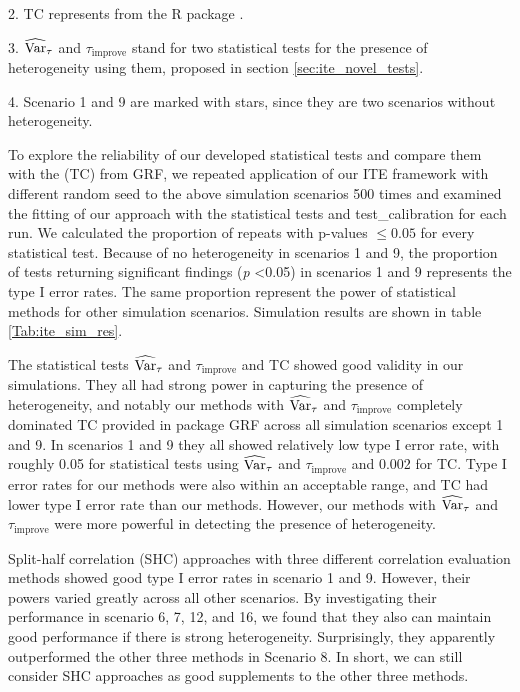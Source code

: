 \begin{table}[htbp]
\begin{threeparttable}
\begin{tablenotes}
            \item 2. TC represents  from the R package .
            \item 3. $\operatorname{\widehat{Var}}_{\tau}$ and $\tau_{\mathrm{improve}}$ stand for two statistical tests for the presence of heterogeneity using them, proposed in section \ref{sec:ite_novel_tests}.
            \item 4. Scenario 1 and 9 are marked with stars, since they are two scenarios without heterogeneity.
          \end{tablenotes}
      \end{threeparttable}
    \label{Tab:ite_sim_res}%
    \end{table}%

    To explore the reliability of our developed statistical tests and compare them with the  (TC) from GRF, we repeated application of our ITE framework with different random seed to the above simulation scenarios 500 times and examined the fitting of our approach with the statistical tests and test\_calibration for each run. We calculated the proportion of repeats with p-values $\leq 0.05$ for every statistical test. Because of no heterogeneity in scenarios 1 and 9, the proportion of tests returning significant findings (\textit{p} <0.05)  in scenarios 1 and 9 represents the type I error rates. The same proportion represent the power of statistical methods for other simulation scenarios. Simulation results are shown in table \ref{Tab:ite_sim_res}.

    The statistical tests $\operatorname{\widehat{Var}}_{\tau}$ and $\tau_{\mathrm{improve}}$ and TC showed good validity in our simulations. They all had strong power in capturing the presence of heterogeneity, and notably our methods with $\operatorname{\widehat{Var}}_{\tau}$ and $\tau_{\mathrm{improve}}$ completely dominated TC provided in package GRF across all simulation scenarios except 1 and 9. In scenarios 1 and 9 they all showed relatively low type I error rate, with roughly 0.05 for statistical tests using $\operatorname{\widehat{Var}}_{\tau}$ and $\tau_{\mathrm{improve}}$ and 0.002 for TC. Type I error rates for our methods were also within an acceptable range, and TC had lower type I error rate than our methods. However, our methods with $\operatorname{\widehat{Var}}_{\tau}$ and $\tau_{\mathrm{improve}}$ were more powerful in detecting the presence of heterogeneity.

    Split-half correlation (SHC) approaches with three different correlation evaluation methods showed good type I error rates in scenario 1 and 9. However,  their powers varied greatly across all other scenarios. By investigating their performance in scenario 6, 7, 12, and 16, we found that they also can maintain good performance if there is strong heterogeneity. Surprisingly, they apparently outperformed the other three methods in Scenario 8. In short, we can still consider SHC approaches as good supplements to the other three methods.

